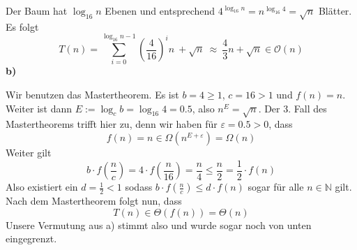 \documentclass[a4paper,graphics,11pt]{article}
\begin{document}
Der Baum hat $\log_{16}n$ Ebenen und entsprechend $4^{\log_{16}n} = n^{\log_{16}4} = \sqrt{n}$  Blätter.
Es folgt
$$
    T(n) = \sum_{i=0}^{\log_{16}n - 1} \left(\frac{4}{16}\right)^i n\ + \sqrt{n}\ 
    \approx\ \frac{4}{3}n + \sqrt{n} \in \mathcal{O}(n)
$$
\newpage
\textbf{b)}

Wir benutzen das Mastertheorem. Es ist $b = 4 \geq 1$, $c = 16 > 1$ und $f(n) = n$.
Weiter ist dann $E := \log_cb = \log_{16} 4 = 0.5$, also $n^E = \sqrt{n}$.
Der 3. Fall des Mastertheorems trifft hier zu, denn wir haben für $\varepsilon = 0.5 > 0$, dass
$$
    f(n) = n \in \Omega(n^{E+\varepsilon}) = \Omega(n)
$$
Weiter gilt
$$
    b\cdot f\left(\frac{n}{c}\right)
    = 4\cdot f\left(\frac{n}{16}\right)
    = \frac{n}{4}
    \leq \frac{n}{2}
    = \frac{1}{2} \cdot f(n)
$$
Also existiert ein $d = \frac{1}{2} < 1$ sodass $b\cdot f(\frac{n}{c}) \leq d\cdot f(n)$ sogar für
alle $n \in \mathbb{N}$ gilt. Nach dem Mastertheorem folgt nun, dass
$$
    T(n) \in \Theta(f(n)) = \Theta(n)
$$
Unsere Vermutung aus a) stimmt also und wurde sogar noch von unten eingegrenzt.
\end{document}
